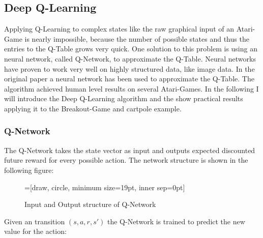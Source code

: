 \subsection{Deep Q-Learning}

Applying Q-Learning to complex states like the raw graphical input of an Atari-Game is nearly impossible, because the number of possible states and thus the entries to the Q-Table grows very quick. One solution to this problem is using an neural network, called Q-Network, to approximate the Q-Table. Neural networks have proven to work very well on highly structured data, like image data. In the original paper a neural network has been used to approximate the Q-Table. The algorithm achieved human level results on several Atari-Games. In the following I will introduce the Deep Q-Learning algorithm and the show practical results applying it to the Breakout-Game and cartpole example. 

\subsubsection{Q-Network}

The Q-Network takes the state vector as input and outputs expected discounted future reward for every possible action. The network structure is shown in the following figure:
\\
\begin{figure}[h]
	\centering

	=[draw, circle, minimum size=19pt, inner sep=0pt]

	\centering
	\caption{Input and Output structure of Q-Network}
	\label{fig:qnet}
\end{figure}

Given an transition $(s, a, r, s')$ the Q-Network is trained to predict the new value for the action: 

